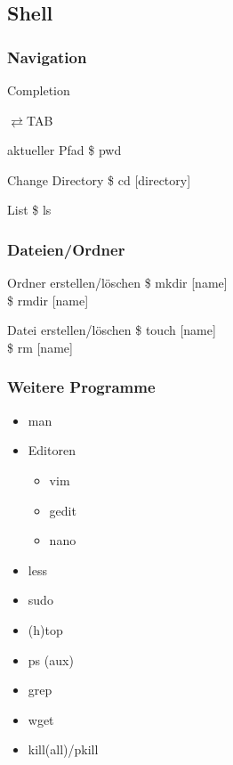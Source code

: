 \documentclass{beamer}
\begin{document}
    \subsection{Shell}
    \begin{frame}
        \frametitle{Navigation}
        \begin{block}{Completion}
            \begin{Huge}
                $\rightleftarrows$TAB
            \end{Huge}
        \end{block}
        \begin{block}{aktueller Pfad}
            \$ pwd
        \end{block}
        \begin{block}{Change Directory}
            \$ cd [directory]
        \end{block}
        \begin{block}{List}
            \$ ls
        \end{block}
    \end{frame}

    \begin{frame}
        \frametitle{Dateien/Ordner}
        \begin{block}{Ordner erstellen/löschen}
            \$ mkdir [name] \\
            \$ rmdir [name]
        \end{block}
        \begin{block}{Datei erstellen/löschen}
            \$ touch [name] \\
            \$ rm [name]
        \end{block}
    \end{frame}

    \begin{frame}
        \frametitle{Weitere Programme}
        \begin{itemize}
            \item man
            \item Editoren
            \begin{itemize}
                \item vim
                \item gedit
                \item nano
            \end{itemize}
            \item less
            \item sudo
            \item (h)top
            \item ps (aux)
            \item grep
            \item wget
            \item kill(all)/pkill
        \end{itemize}
    \end{frame}
\end{document}
